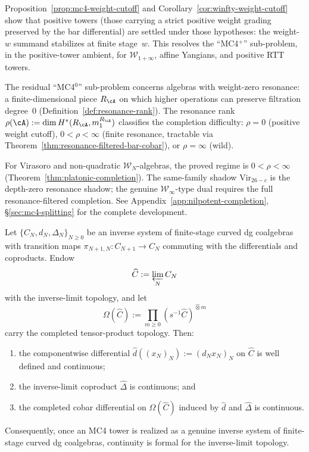 \begin{remark}
\label{rem:mc4-positive-vs-resonant}
Proposition~\ref{prop:mc4-weight-cutoff} and
Corollary~\ref{cor:winfty-weight-cutoff} show that positive towers
(those carrying a strict positive weight grading preserved by the bar
differential) are settled under those hypotheses:
the weight-$w$ summand stabilizes at finite stage~$w$.
This resolves the ``MC4$^+$'' sub-problem, in the positive-tower
ambient, for
$\mathcal{W}_{1+\infty}$, affine Yangians, and positive RTT towers.

The residual ``MC4$^0$'' sub-problem concerns algebras with
weight-zero resonance: a finite-dimensional piece $R_\cA$ on which
higher operations can preserve filtration degree~$0$
(Definition~\ref{def:resonance-rank}). The resonance rank
$\rho(\cA) := \dim H^*(R_\cA, m_1^{R_\cA})$ classifies the
completion difficulty: $\rho = 0$ (positive weight cutoff),
$0 < \rho < \infty$ (finite resonance, tractable via
Theorem~\ref{thm:resonance-filtered-bar-cobar}), or
$\rho = \infty$ (wild).

For Virasoro and non-quadratic $\mathcal{W}_N$-algebras, the
proved regime is $0 < \rho < \infty$
(Theorem~\ref{thm:platonic-completion}).
The same-family shadow $\mathrm{Vir}_{26-c}$ is the depth-zero
resonance shadow; the genuine $\mathcal{W}_\infty$-type dual
requires the full resonance-filtered completion.
See Appendix~\ref{app:nilpotent-completion},
\S\ref{sec:mc4-splitting} for the complete development.
\end{remark}

\begin{proposition}
\label{prop:inverse-limit-differential-continuity}
Let $\{C_N,d_N,\Delta_N\}_{N \ge 0}$ be an inverse system of finite-stage
curved dg coalgebras with transition maps
$\pi_{N+1,N}\colon C_{N+1}\to C_N$ commuting with the differentials and
coproducts. Endow
\[
\widehat C := \varprojlim_N C_N
\]
with the inverse-limit topology, and let
\[
\Omega(\widehat C)
:=
\prod_{m \ge 0} (s^{-1}\widehat C)^{\widehat\otimes m}
\]
carry the completed tensor-product topology. Then:
\begin{enumerate}
\item the componentwise differential
 $\widehat d((x_N)_N):=(d_Nx_N)_N$ on $\widehat C$ is well defined and
 continuous;
\item the inverse-limit coproduct $\widehat\Delta$ is continuous; and
\item the completed cobar differential on $\Omega(\widehat C)$ induced
 by $\widehat d$ and $\widehat\Delta$ is continuous.
\end{enumerate}
Consequently, once an MC4 tower is realized as a genuine inverse system
of finite-stage curved dg coalgebras, continuity is formal for the
inverse-limit topology.
\end{proposition}


